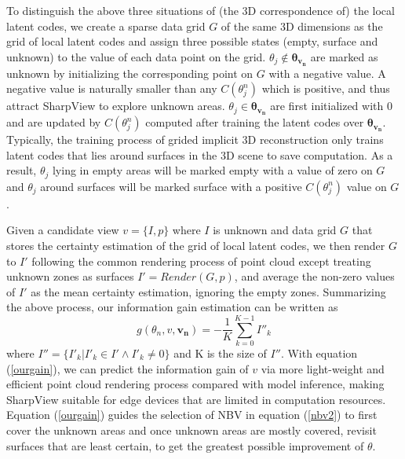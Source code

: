 To distinguish the above three situations of (the 3D correspondence of) the local latent codes, we create a sparse data grid $G$ of the same 3D dimensions as the grid of local latent codes and assign three possible states (empty, surface and unknown) to the value of each data point on the grid.
$\theta_j \notin \bm{\theta_{v_n}}$ are marked as unknown by initializing the corresponding point on $G$ with a negative value.
A negative value is naturally smaller than any $C(\theta_j^{n})$ which is positive, and thus attract SharpView to explore unknown areas.
$\theta_j \in \bm{\theta_{v_n}}$ are first initialized with 0 and are updated by $C(\theta_j^{n})$ computed after training the latent codes over $\bm{\theta_{v_n}}$.
Typically, the training process of grided implicit 3D reconstruction only trains latent codes that lies around surfaces in the 3D scene to save computation.
As a result, $\theta_j$ lying in empty areas will be marked empty with a value of zero on $G$ and $\theta_j$ around surfaces will be marked surface with a positive $C(\theta_j^{n})$ value on $G$.

Given a candidate view $v=\{I,p\}$ where $I$ is unknown and data grid $G$ that stores the certainty estimation of the grid of local latent codes, we then render $G$ to $I'$ following the common rendering process of point cloud except treating unknown zones as surfaces $I'=Render(G,p)$, and average the non-zero values of $I'$ as the mean certainty estimation, ignoring the empty zones.
Summarizing the above process, our information gain estimation can be written as 
\begin{equation}
    g(\theta_n, v, \bm{v_n}) = -\frac{1}{K} \sum_{k=0}^{K-1} I''_k
    \label{ourgain}
\end{equation}
where $I'' = \{I'_k|I'_k\in I'\land  I'_k \neq 0\}$ and K is the size of $I''$.
With equation (\ref*{ourgain}), we can predict the information gain of $v$ via more light-weight and efficient point cloud rendering process compared with model inference, making SharpView suitable for edge devices that are limited in computation resources.
Equation (\ref*{ourgain}) guides the selection of NBV in equation (\ref*{nbv2}) to first cover the unknown areas and once unknown areas are mostly covered, revisit surfaces that are least certain, to get the greatest possible improvement of $\theta$.


